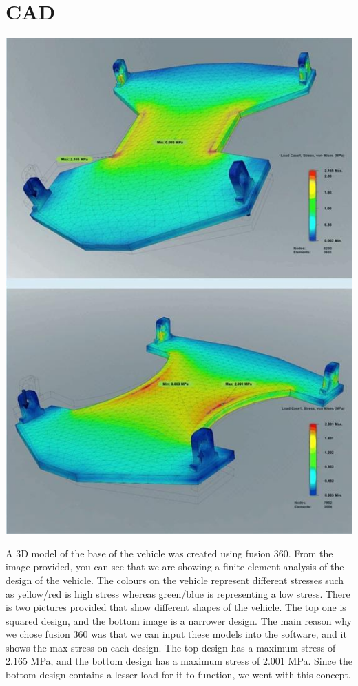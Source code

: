 \documentclass{article}
\begin{document}
\section{CAD}
\begin{minipage}{0.4\textwidth}
	\centering
	\includegraphics[width=1\textwidth]{extracted_images2/image_9_2.png}
\end{minipage}\hfil
\begin{minipage}{0.55\textwidth}
	A 3D model of the base of the vehicle was created using fusion 360. From the image provided, you can see that we are showing a finite element analysis of the design of the vehicle. The colours on the vehicle represent different stresses such as yellow/red is high stress whereas green/blue is representing a low stress. There is two pictures provided that show different shapes of the vehicle. The top one is squared design, and the bottom image is a narrower design. The main reason why we chose fusion 360 was that we can input these models into the software, and it shows the max stress on each design. The top design has a maximum stress of 2.165 MPa, and the bottom design has a maximum stress of 2.001 MPa. Since the bottom design contains a lesser load for it to function, we went with this concept.
\end{minipage}\\[8pt]
\end{document}
